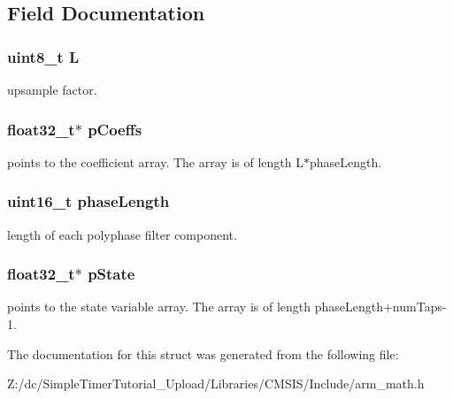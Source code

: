 \subsection{Field Documentation}
\hypertarget{structarm__fir__interpolate__instance__f32_aee73cc056696e504430c53eaa9c58cf0}{
\subsubsection[{L}]{\setlength{\rightskip}{0pt plus 5cm}uint8\-\_\-t L}}\label{structarm__fir__interpolate__instance__f32_aee73cc056696e504430c53eaa9c58cf0}
upsample factor. \hypertarget{structarm__fir__interpolate__instance__f32_aacbb8dd8eeba4b21fc2bb40076405ee3}{
\subsubsection[{p\-Coeffs}]{\setlength{\rightskip}{0pt plus 5cm}float32\-\_\-t$\ast$ p\-Coeffs}}\label{structarm__fir__interpolate__instance__f32_aacbb8dd8eeba4b21fc2bb40076405ee3}
points to the coefficient array. The array is of length L$\ast$phase\-Length. \hypertarget{structarm__fir__interpolate__instance__f32_a8f92bb07e0812f94679438cdf412b26a}{
\subsubsection[{phase\-Length}]{\setlength{\rightskip}{0pt plus 5cm}uint16\-\_\-t phase\-Length}}\label{structarm__fir__interpolate__instance__f32_a8f92bb07e0812f94679438cdf412b26a}
length of each polyphase filter component. \hypertarget{structarm__fir__interpolate__instance__f32_a335c87e6fdc4b96601d95a5de8b9c463}{
\subsubsection[{p\-State}]{\setlength{\rightskip}{0pt plus 5cm}float32\-\_\-t$\ast$ p\-State}}\label{structarm__fir__interpolate__instance__f32_a335c87e6fdc4b96601d95a5de8b9c463}
points to the state variable array. The array is of length phase\-Length+num\-Taps-\/1. 

The documentation for this struct was generated from the following file\-:\begin{DoxyCompactItemize}
\item 
Z\-:/dc/\-Simple\-Timer\-Tutorial\-\_\-\-Upload/\-Libraries/\-C\-M\-S\-I\-S/\-Include/arm\-\_\-math.\-h\end{DoxyCompactItemize}
